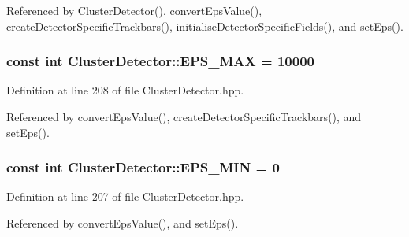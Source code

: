 \-Referenced by \-Cluster\-Detector(), convert\-Eps\-Value(), create\-Detector\-Specific\-Trackbars(), initialise\-Detector\-Specific\-Fields(), and set\-Eps().

\hypertarget{classmultiscale_1_1analysis_1_1ClusterDetector_a76d0b4ecd2793d478317cc1bc856e06f}{
\subsubsection[{\-E\-P\-S\-\_\-\-M\-A\-X}]{\setlength{\rightskip}{0pt plus 5cm}const int {\bf \-Cluster\-Detector\-::\-E\-P\-S\-\_\-\-M\-A\-X} = 10000}}\label{classmultiscale_1_1analysis_1_1ClusterDetector_a76d0b4ecd2793d478317cc1bc856e06f}


\-Definition at line 208 of file \-Cluster\-Detector.\-hpp.



\-Referenced by convert\-Eps\-Value(), create\-Detector\-Specific\-Trackbars(), and set\-Eps().

\hypertarget{classmultiscale_1_1analysis_1_1ClusterDetector_a6c3517e03d1fd2c6b4d6cd0d81eb8684}{
\subsubsection[{\-E\-P\-S\-\_\-\-M\-I\-N}]{\setlength{\rightskip}{0pt plus 5cm}const int {\bf \-Cluster\-Detector\-::\-E\-P\-S\-\_\-\-M\-I\-N} = 0}}\label{classmultiscale_1_1analysis_1_1ClusterDetector_a6c3517e03d1fd2c6b4d6cd0d81eb8684}


\-Definition at line 207 of file \-Cluster\-Detector.\-hpp.



\-Referenced by convert\-Eps\-Value(), and set\-Eps().


